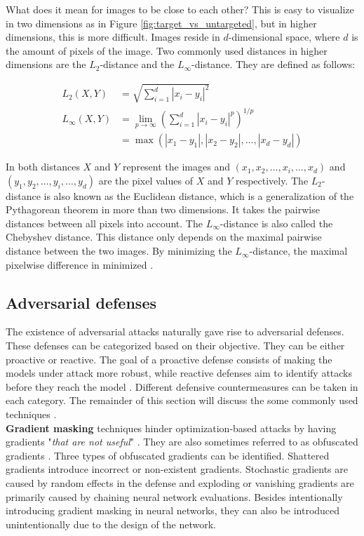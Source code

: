 What does it mean for images to be close to each other? This is easy to visualize in two dimensions as in Figure \ref{fig:target_vs_untargeted}, but in higher dimensions, this is more difficult. Images reside in $d$-dimensional space, where $d$ is the amount of pixels of the image. Two commonly used distances in higher dimensions are the $L_2$-distance and the $L_\infty$-distance. They are defined as follows:

\begin{align*}
L_2(X, Y) &= \sqrt{\sum_{i=1}^d|x_i - y_i|^2} \\
L_\infty(X, Y) &= \lim_{p\rightarrow \infty}\left( \sum_{i=1}^d|x_i-y_i|^p\right)^{1/p} \\
&= \max (|x_1 - y_1|, |x_2-y_2|, \ldots, |x_d-y_d|)
\end{align*}

In both distances $X$ and $Y$ represent the images and $(x_1, x_2, \ldots, x_i, \ldots, x_d)$ and $(y_1, y_2, \ldots, y_i, \ldots, y_d)$ are the pixel values of $X$ and $Y$ respectively. The $L_2$-distance is also known as the Euclidean distance, which is a generalization of the Pythagorean theorem in more than two dimensions. It takes the pairwise distances between all pixels into account. The $L_\infty$-distance is also called the Chebyshev distance. This distance only depends on the maximal pairwise distance between the two images. By minimizing the $L_\infty$-distance, the maximal pixelwise difference in minimized \cite{wiki_distances}. 

\subsection{Adversarial defenses}\label{sec:adversarial_defenses}
The existence of adversarial attacks naturally gave rise to adversarial defenses. These defenses can be categorized based on their objective. They can be either proactive or reactive. The goal of a proactive defense consists of making the models under attack more robust, while reactive defenses aim to identify attacks before they reach the model \cite{adversarial_defense_survey}. Different defensive countermeasures can be taken in each category. The remainder of this section will discuss the some commonly used techniques \cite{defenses_survey}.\\

\textbf{Gradient masking} techniques hinder optimization-based attacks by having gradients "\textit{that are not useful}" \cite{not_useful_gradients}. They are also sometimes referred to as obfuscated gradients \cite{obfuscated_gradients}. Three types of obfuscated gradients can be identified. Shattered gradients introduce incorrect or non-existent gradients. Stochastic gradients are caused by random effects in the defense and exploding or vanishing gradients are primarily caused by chaining neural network evaluations. Besides intentionally introducing gradient masking in neural networks, they can also be introduced unintentionally due to the design of the network.\\

